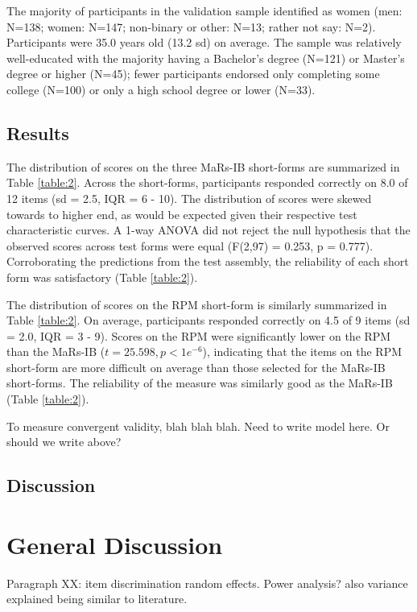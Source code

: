 \documentclass[a4paper,man,natbib]{apa6}
\begin{document}
The majority of participants in the validation sample identified as women (men: N=138; women: N=147; non-binary or other: N=13; rather not say: N=2). Participants were 35.0 years old (13.2 sd) on average. The sample was relatively well-educated with the majority having a Bachelor's degree (N=121) or Master's degree or higher (N=45); fewer participants endorsed only completing some college (N=100) or only a high school degree or lower (N=33). 

\subsection{Results}

The distribution of scores on the three MaRs-IB short-forms are summarized in Table \ref{table:2}. Across the short-forms, participants responded correctly on 8.0 of 12 items (sd = 2.5, IQR = 6 - 10). The distribution of scores were skewed towards to higher end, as would be expected given their respective test characteristic curves. A 1-way ANOVA did not reject the null hypothesis that the observed scores across test forms were equal (F(2,97) = 0.253, p = 0.777). Corroborating the predictions from the test assembly, the reliability of each short form was satisfactory (Table \ref{table:2}). 

The distribution of scores on the RPM short-form is similarly summarized in Table \ref{table:2}. On average, participants responded correctly on 4.5 of 9 items (sd = 2.0, IQR = 3 - 9). Scores on the RPM were significantly lower on the RPM than the MaRs-IB ($t = 25.598, p < 1e^{-6}$), indicating that the items on the RPM short-form are more difficult on average than those selected for the MaRs-IB short-forms. The reliability of the measure was similarly good as the MaRs-IB (Table \ref{table:2}). 

To measure convergent validity, blah blah blah. Need to write model here. Or should we write above?

\subsection{Discussion}

\section{General Discussion}

Paragraph XX: item discrimination random effects. Power analysis? also variance explained being similar to literature.
\end{document}
